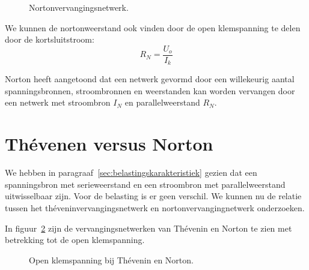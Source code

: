\begin{figure}[!ht]
\centering
{}
\caption{Nortonvervangingsnetwerk.}
\label{fig:gelnortonvervangingsschema}
\end{figure}

We kunnen de nortonweerstand ook vinden door de open klemspanning te delen door de kortsluitstroom:
%
\begin{equation}
R_N = \dfrac{U_o}{I_k}
\end{equation}

Norton heeft aangetoond dat een netwerk gevormd door een willekeurig aantal spanningsbronnen,
stroombronnen en weerstanden kan worden vervangen door een netwerk met stroombron $I_N$ en
parallelweerstand $R_N$.

\section{Th\'evenen versus Norton}
We hebben in paragraaf~\ref{sec:belastingskarakteristiek} gezien dat een spanningsbron met serieweerstand
en een stroombron met parallelweerstand uitwisselbaar zijn. Voor de belasting is er geen verschil.
We kunnen nu de relatie tussen het th\'eveninvervangingsnetwerk en nortonvervangingnetwerk onderzoeken.

In figuur~\ref{fig:gelopenklemspanningbijtheveninennorton} zijn de vervangingsnetwerken van Th\'evenin
en Norton te zien met betrekking tot de open klemspanning.

\begin{figure}[!ht]
\centering
\begin{subfigure}[b]{0.48\textwidth}
\centering
{}
\end{subfigure}%
\begin{subfigure}[b]{0.48\textwidth}
\centering
{}
\end{subfigure}
\caption{Open klemspanning bij Th\'evenin en Norton.}
\label{fig:gelopenklemspanningbijtheveninennorton}
\end{figure}

